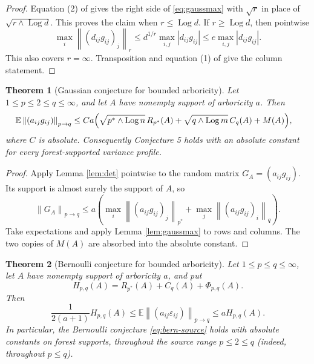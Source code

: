 \documentclass[11pt]{article}
\newtheorem{theorem}{Theorem}
\theoremstyle{definition}
\theoremstyle{remark}
\newcommand{\E}{\mathbb E}
\newcommand{\eps}{\varepsilon}
\newcommand{\Log}{\operatorname{Log}}
\newcommand{\opnorm}[1]{\left\lVert #1\right\rVert}
\begin{document}
\begin{proof}
Equation (2) of \cite{LS} gives the right side of \eqref{eq:gaussmax} with
$\sqrt r$ in place of $\sqrt{r\wedge\Log d}$.  This proves the claim when
$r\le\Log d$.  If $r\ge\Log d$, then pointwise
\[
 \max_i\opnorm{(d_{ij}g_{ij})_j}_r
 \le d^{1/r}\max_{i,j}|d_{ij}g_{ij}|
 \le e\max_{i,j}|d_{ij}g_{ij}|.
\]
This also covers $r=\infty$.  Transposition and equation (1) of \cite{LS}
give the column statement.
\end{proof}

\begin{theorem}[Gaussian conjecture for bounded arboricity]\label{thm:gauss}
Let $1\le p\le2\le q\le\infty$, and let $A$ have nonempty support of
arboricity $a$.  Then
\begin{align}\label{eq:gauss-result}
 \E\opnorm{(a_{ij}g_{ij})}_{p\to q}
 \le Ca\Bigl(&\sqrt{p^*\wedge\Log n}\,R_{p^*}(A)
 +\sqrt{q\wedge\Log m}\,C_q(A)+M(A)\Bigr),
\end{align}
where $C$ is absolute.  Consequently Conjecture 5 holds with an absolute
constant for every forest-supported variance profile.
\end{theorem}

\begin{proof}
Apply Lemma \ref{lem:det} pointwise to the random matrix
$G_A=(a_{ij}g_{ij})$.  Its support is almost surely the support of $A$, so
\[
 \opnorm{G_A}_{p\to q}
 \le a\left(
 \max_i\opnorm{(a_{ij}g_{ij})_j}_{p^*}
 +\max_j\opnorm{(a_{ij}g_{ij})_i}_{q}\right).
\]
Take expectations and apply Lemma \ref{lem:gaussmax} to rows and columns.
The two copies of $M(A)$ are absorbed into the absolute constant.
\end{proof}

\begin{theorem}[Bernoulli conjecture for bounded arboricity]\label{thm:bern}
Let $1\le p\le q\le\infty$, let $A$ have nonempty support of arboricity $a$,
and put
\[
 H_{p,q}(A)=R_{p^*}(A)+C_q(A)+\Phi_{p,q}(A).
\]
Then
\begin{equation}\label{eq:bern-result}
 \frac{1}{2(a+1)}H_{p,q}(A)
 \le \E\opnorm{(a_{ij}\eps_{ij})}_{p\to q}
 \le aH_{p,q}(A).
\end{equation}
In particular, the Bernoulli conjecture \eqref{eq:bern-source} holds with
absolute constants on forest supports, throughout the source range
$p\le2\le q$ (indeed, throughout $p\le q$).
\end{theorem}
\end{document}
